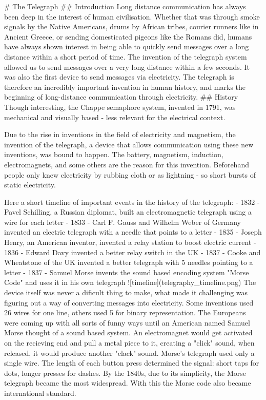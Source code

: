 # The Telegraph 
## Introduction
Long distance communication has always been deep in the interest of human civilisation. Whether that was through smoke signals by the Native Americans, drums by African tribes, courier runners like in Ancient Greece, or sending domesticated pigeons like the Romans did, humans have always shown interest in being able to quickly send messages over a long distance within a short period of time. 
The invention of the telegraph system allowed us to send messages over a very long distance within a few seconds. It was also the first device to send messages via electricity. The telegraph is therefore an incredibly important invention in human history, and marks the beginning of long-distance communication through electricity.
## History 
Though interesting, the Chappe semaphore system, invented in 1791, was mechanical and visually based - less relevant for the electrical context.

Due to the rise in inventions in the field of electricity and magnetism, the invention of the telegraph, a device that allows communication using these new inventions, was bound to happen. The battery, magnetism, induction, electromagnets, and some others are the reason for this invention. Beforehand people only knew electricity by rubbing cloth or as lightning - so short bursts of static electricity. 

Here a short timeline of important events in the history of the telegraph:
- 1832 - Pavel Schilling, a Russian diplomat, built an electromagnetic telegraph using a wire for each letter    
- 1833 - Carl F. Gauss and Wilhelm Weber of Germany invented an electric telegraph with a needle that points to a letter  
- 1835 - Joseph Henry, an American inventor, invented a relay station to boost electric current  
- 1836 - Edward Davy invented a better relay switch in the UK  
- 1837 - Cooke and Wheatstone of the UK invented a better telegraph with 5 needles pointing to a letter  
- 1837 - Samuel Morse invents the sound based encoding system "Morse Code" and uses it in his own telegraph   
![timeline](telegraphy_timeline.png)
The device itself was never a dificult thing to make, what made it challenging was figuring out a way of converting messages into electricity.
Some inventions used 26 wires for one line, others used 5 for binary representation.  
The Europeans were coming up with all sorts of funny ways until an American named Samuel Morse thought of a sound based system. An electromagnet would get activated on the recieving end and pull a metal piece to it, creating a "click" sound, when released, it would produce another "clack" sound. Morse's telegraph used only a single wire. The length of each button press determined the signal: short taps for dots, longer presses for dashes. By the 1840s, due to its simplicity, the Morse telegraph became the most widespread. With this the Morse code also became international standard.

